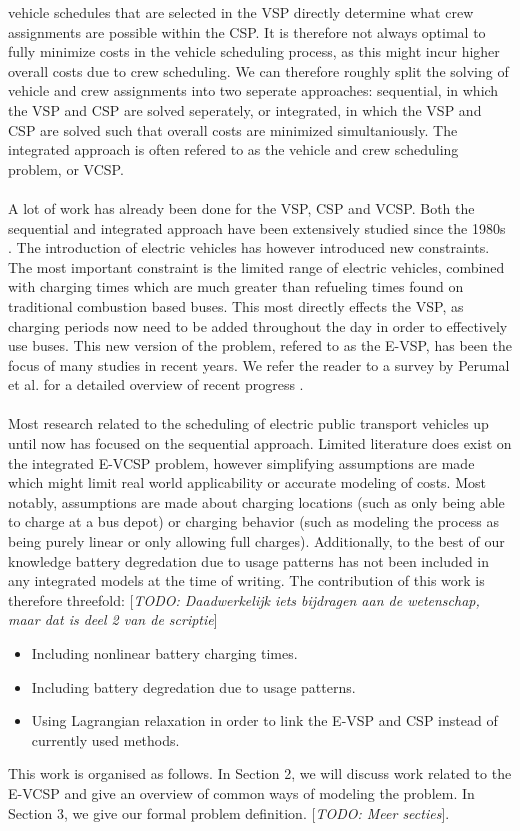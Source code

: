 \documentclass[]{article}
\newcommand{\todo}[1]{{\color{red}[\textit{TODO: #1}]}}
\begin{document}
vehicle schedules that are selected in the VSP directly determine what crew
assignments are possible within the CSP. It is therefore not always optimal to
fully minimize costs in the vehicle scheduling process, as this might incur
higher overall costs due to crew scheduling. We can therefore roughly split the
solving of vehicle and crew assignments into two seperate approaches:
sequential, in which the VSP and CSP are solved seperately, or integrated, in
which the VSP and CSP are solved such that overall costs are minimized
simultaniously. The integrated approach is often refered to as the vehicle and
crew scheduling problem, or VCSP. \\\\ A lot of work has already been done for the VSP, CSP and VCSP.
Both the sequential and integrated approach have been extensively studied since the 1980s \cite{Bodin1983}. The
introduction of electric vehicles has however introduced new constraints. The
most important constraint is the limited range of electric vehicles, combined
with charging times which are much greater than refueling times found on
traditional combustion based buses. This most directly effects the VSP, as
charging periods now need to be added throughout the day in order to
effectively use buses. This new version of the problem, refered to as the
E-VSP, has been the focus of many studies in recent years. We refer the reader
to a survey by Perumal et al. for a detailed overview of recent progress
\cite{Perumal2022LitRev}. \\\\ Most research related to the scheduling of
electric public transport vehicles up until now has focused on the sequential
approach. Limited literature does exist on the integrated E-VCSP problem, however
simplifying assumptions are made which might limit real world applicability or
accurate modeling of costs. Most notably, assumptions are made about charging
locations (such as only being able to charge at a bus depot) or charging
behavior (such as modeling the process as being purely linear or only allowing
full charges). Additionally, to the best of our knowledge battery degredation
due to usage patterns has not been included in any integrated models at the
time of writing. The contribution of this work is therefore threefold: \todo{Daadwerkelijk iets bijdragen aan de wetenschap, maar dat is deel 2 van de scriptie}
\begin{itemize}
  \item Including nonlinear battery charging times.
  \item Including battery degredation due to usage patterns.
  \item Using Lagrangian relaxation in order to link the E-VSP and CSP instead of
        currently used methods.
\end{itemize}
This work is organised as follows. In Section 2, we will discuss work related to the E-VCSP and give an overview of common ways of modeling the problem. In Section 3, we give our formal problem definition. \todo{Meer secties}.
\end{document}
